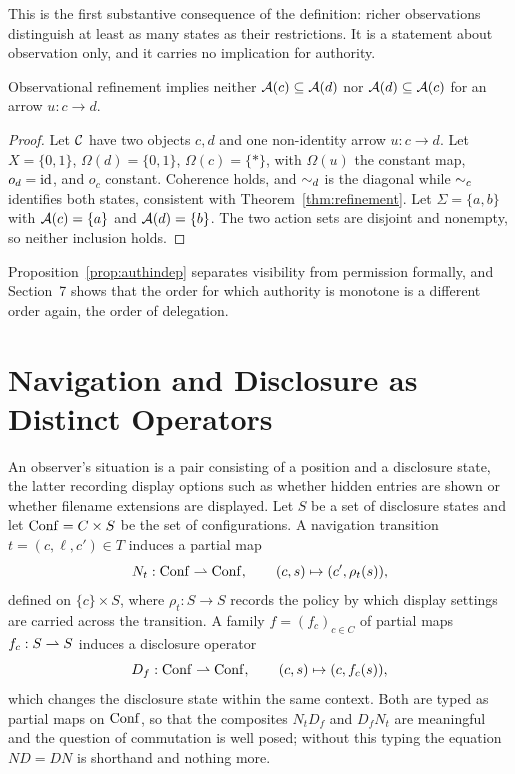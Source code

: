 This is the first substantive consequence of the definition: richer observations distinguish at least as many states as their restrictions. It is a statement about observation only, and it carries no implication for authority.

\begin{proposition}\label{prop:authindep}
Observational refinement implies neither $\mathcal A(c)\subseteq\mathcal A(d)$ nor $\mathcal A(d)\subseteq\mathcal A(c)$ for an arrow $u:c\to d$.
\end{proposition}
\begin{proof}
Let $\mathcal C$ have two objects $c,d$ and one non-identity arrow $u:c\to d$. Let $X=\{0,1\}$, $\Omega(d)=\{0,1\}$, $\Omega(c)=\{\ast\}$, with $\Omega(u)$ the constant map, $o_d=\mathrm{id}$, and $o_c$ constant. Coherence holds, and $\sim_d$ is the diagonal while $\sim_c$ identifies both states, consistent with Theorem~\ref{thm:refinement}. Let $\Sigma=\{a,b\}$ with $\mathcal A(c)=\{a\}$ and $\mathcal A(d)=\{b\}$. The two action sets are disjoint and nonempty, so neither inclusion holds.
\end{proof}

Proposition~\ref{prop:authindep} separates visibility from permission formally, and Section~7 shows that the order for which authority is monotone is a different order again, the order of delegation.

\section{Navigation and Disclosure as Distinct Operators}

An observer's situation is a pair consisting of a position and a disclosure state, the latter recording display options such as whether hidden entries are shown or whether filename extensions are displayed. Let $S$ be a set of disclosure states and let $\mathrm{Conf}=C\times S$ be the set of configurations. A navigation transition $t=(c,\ell,c')\in T$ induces a partial map
\[
N_t:\mathrm{Conf}\rightharpoonup\mathrm{Conf},\qquad (c,s)\mapsto(c',\rho_t(s)),
\]
defined on $\{c\}\times S$, where $\rho_t:S\to S$ records the policy by which display settings are carried across the transition. A family $f=(f_c)_{c\in C}$ of partial maps $f_c:S\rightharpoonup S$ induces a disclosure operator
\[
D_f:\mathrm{Conf}\rightharpoonup\mathrm{Conf},\qquad (c,s)\mapsto(c,f_c(s)),
\]
which changes the disclosure state within the same context. Both are typed as partial maps on $\mathrm{Conf}$, so that the composites $N_tD_f$ and $D_fN_t$ are meaningful and the question of commutation is well posed; without this typing the equation $ND=DN$ is shorthand and nothing more.

